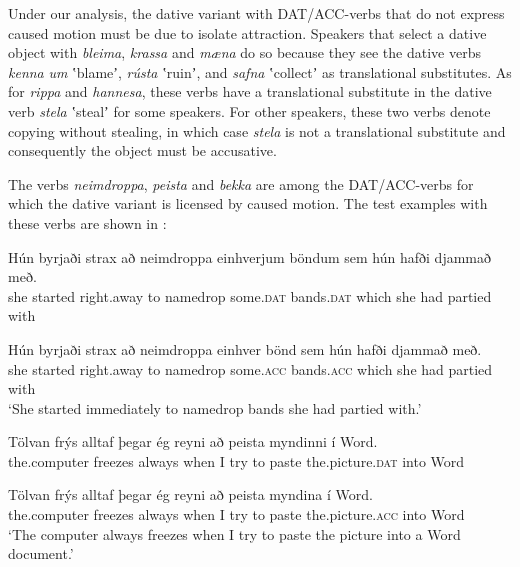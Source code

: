 \documentclass[output=paper,modfonts,nonflat,colorlinks,citecolor=brown]{langsci/langscibook}
\begin{document}
Under our analysis, the dative variant with DAT/ACC-verbs that do not express caused motion must be due to isolate attraction. Speakers that select a dative object with \textit{bleima}, \textit{krassa} and \textit{mæna} do so because they see the dative verbs \textit{kenna} \textit{um} ʽblameʼ, \textit{rústa} ʽruinʼ, and \textit{safna} ʽcollectʼ as translational substitutes. As for \textit{rippa} and \textit{hannesa}, these verbs have a translational substitute in the dative verb \textit{stela} ʽstealʼ for some speakers. For other speakers, these two verbs denote copying without stealing, in which case \textit{stela} is not a translational substitute and consequently the object must be accusative.

The verbs \textit{neimdroppa}, \textit{peista} and \textit{bekka} are among the DAT/ACC-verbs for which the dative variant is licensed by caused motion. The test examples with these verbs are shown in :


\ea%
\label{ex:jonsson:7}
\ea\label{ex:jonsson:7a}
\gll  Hún  byrjaði  strax  að  neimdroppa  einhverjum  böndum  sem  hún  hafði  djammað  með.\\
   she  started  right.away  to  namedrop  some.\textsc{dat}  bands.\textsc{dat}  which  she  had  partied  with\\
\glt { }


\ex\label{ex:jonsson:7b}
\gll   Hún  byrjaði  strax  að  neimdroppa  einhver  bönd  sem  hún  hafði  djammað  með.\\
 she  started  right.away  to  namedrop  some.\textsc{acc}  bands.\textsc{acc}  which  she  had  partied  with\\
 \glt `She started immediately to namedrop bands she had partied with.'


\ex\label{ex:jonsson:7c}
\gll   Tölvan  frýs  alltaf  þegar  ég  reyni  að  peista  myndinni  í  Word.  \\
 the.computer  freezes  always  when  I  try  to  paste  the.picture.\textsc{dat}  into  Word  \\
\glt { }

\ex\label{ex:jonsson:7d}
\gll   Tölvan  frýs  alltaf  þegar  ég  reyni  að  peista  myndina  í  Word.\\
 the.computer  freezes  always  when  I  try  to  paste  the.picture.\textsc{acc}  into  Word\\
`The computer always freezes when I try to paste the picture into a Word document.'%
\end{document}
